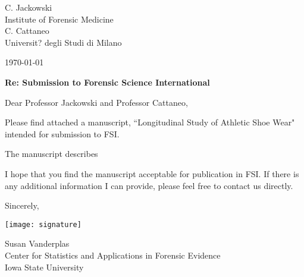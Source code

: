 \documentclass[11pt]{article}
\begin{document}
C. Jackowski \\
Institute of Forensic Medicine\vspace{.5em}\\
C. Cattaneo \\
Universit? degli Studi di Milano \vspace{2em}

\today\\\vspace{1em}

{\bf Re: Submission to Forensic Science International}\\\vspace{2em}

Dear Professor Jackowski and Professor Cattaneo, \vspace{1em}

Please find attached a manuscript, ``Longitudinal Study of Athletic Shoe Wear" intended for submission to FSI. \vspace{1em}

The manuscript describes  \vspace{1em}

I hope that you find the manuscript acceptable for publication in FSI. If there is any additional information I can provide, please feel free to contact us directly. \vspace{0.25in}

Sincerely,\\
\begin{minipage}{.25\linewidth}
\vspace*{.5cm}
\texttt{[image: signature]}
\vspace*{.5cm}
\end{minipage}

Susan Vanderplas\\
Center for Statistics and Applications in Forensic Evidence\\
Iowa State University
\end{document}
